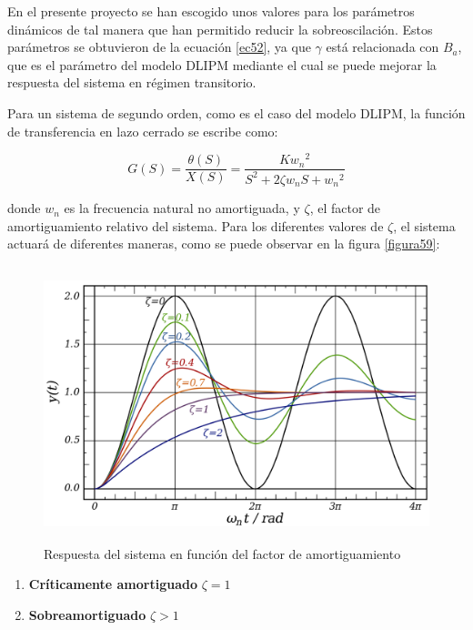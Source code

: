 \begin{itemize}
En el presente proyecto se han escogido unos valores para los parámetros dinámicos de tal manera que han permitido reducir la sobreoscilación. Estos parámetros se obtuvieron de la ecuación \ref{ec52}, ya que $\gamma$ está relacionada con $B_a$, que es el parámetro del modelo DLIPM mediante el cual se puede mejorar la respuesta del sistema en régimen transitorio.

Para un sistema de segundo orden, como es el caso del modelo DLIPM, la función de transferencia en lazo cerrado se escribe como:

\begin{equation}
G(S)=\frac{\theta(S)}{X(S)}=\frac{K{w_{n}}^{2}}{S^{2} + 2\zeta w_{n}S + {w_{n}}^{2}}
\label{ec58}
\end{equation}

donde $w_{n}$ es la frecuencia natural no amortiguada, y $\zeta$, el factor de amortiguamiento relativo del sistema. Para los diferentes valores de $\zeta$, el sistema actuará de diferentes maneras, como se puede observar en la figura \ref{figura59}:

\begin{figure}[H]
\centering
\includegraphics[width=13cm, height=8cm]{imagenes/apartado_5/59_zeta_response_system}
\caption{Respuesta del sistema en función del factor de amortiguamiento}
\label{figura510}
\end{figure}


\begin{enumerate}

\item \textbf{Críticamente amortiguado} $\zeta = 1$

\item \textbf{Sobreamortiguado} $\zeta > 1$


\end{enumerate}
\end{itemize}
